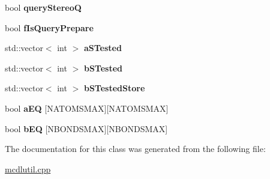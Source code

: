 \begin{DoxyCompactItemize}
\item 
\hypertarget{class_open_babel_1_1_t_edited_molecule_a7e890c9bbccae378c5b63d9100c4048b}{bool {\bfseries query\-Stereo\-Q}}\label{class_open_babel_1_1_t_edited_molecule_a7e890c9bbccae378c5b63d9100c4048b}

\item 
\hypertarget{class_open_babel_1_1_t_edited_molecule_a44ab1d356f0d7d438ddc8620822ca719}{bool {\bfseries f\-Is\-Query\-Prepare}}\label{class_open_babel_1_1_t_edited_molecule_a44ab1d356f0d7d438ddc8620822ca719}

\item 
\hypertarget{class_open_babel_1_1_t_edited_molecule_a9e3f81ca4262b0cd51af4b9581b7e3d4}{std\-::vector$<$ int $>$ {\bfseries a\-S\-Tested}}\label{class_open_babel_1_1_t_edited_molecule_a9e3f81ca4262b0cd51af4b9581b7e3d4}

\item 
\hypertarget{class_open_babel_1_1_t_edited_molecule_a0bd154926eefb7c37d8c24ad7c36a8c6}{std\-::vector$<$ int $>$ {\bfseries b\-S\-Tested}}\label{class_open_babel_1_1_t_edited_molecule_a0bd154926eefb7c37d8c24ad7c36a8c6}

\item 
\hypertarget{class_open_babel_1_1_t_edited_molecule_afbcb92c0451f301d5acb1364b4c35085}{std\-::vector$<$ int $>$ {\bfseries b\-S\-Tested\-Store}}\label{class_open_babel_1_1_t_edited_molecule_afbcb92c0451f301d5acb1364b4c35085}

\item 
\hypertarget{class_open_babel_1_1_t_edited_molecule_a83fa5cf2e5cfd46824a3c3f70254aaab}{bool {\bfseries a\-E\-Q} \mbox{[}N\-A\-T\-O\-M\-S\-M\-A\-X\mbox{]}\mbox{[}N\-A\-T\-O\-M\-S\-M\-A\-X\mbox{]}}\label{class_open_babel_1_1_t_edited_molecule_a83fa5cf2e5cfd46824a3c3f70254aaab}

\item 
\hypertarget{class_open_babel_1_1_t_edited_molecule_adb8b853f6eb25d8045648de562707d9a}{bool {\bfseries b\-E\-Q} \mbox{[}N\-B\-O\-N\-D\-S\-M\-A\-X\mbox{]}\mbox{[}N\-B\-O\-N\-D\-S\-M\-A\-X\mbox{]}}\label{class_open_babel_1_1_t_edited_molecule_adb8b853f6eb25d8045648de562707d9a}

\end{DoxyCompactItemize}


The documentation for this class was generated from the following file\-:\begin{DoxyCompactItemize}
\item 
\hyperlink{mcdlutil_8cpp}{mcdlutil.\-cpp}\end{DoxyCompactItemize}
